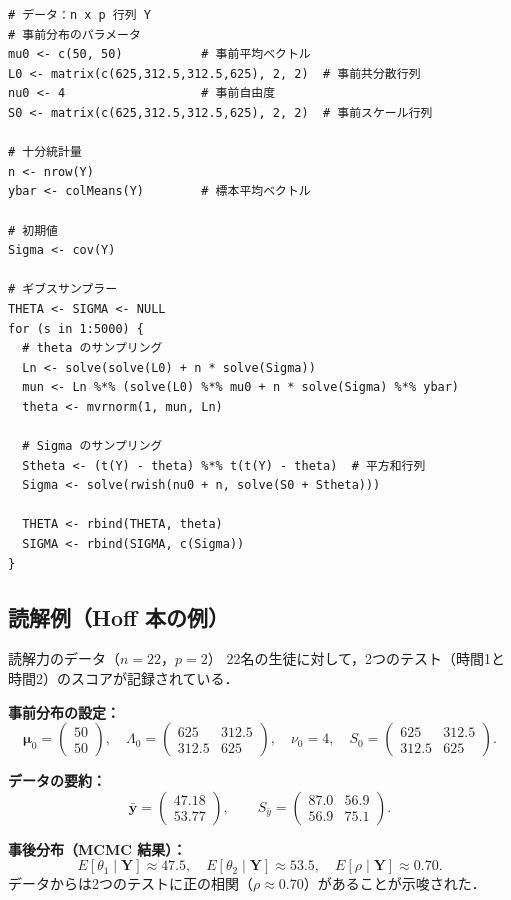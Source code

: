 \documentclass[lualatex,ja=standard,a4paper,12pt]{bxjsarticle}
\begin{document}
\begin{lstlisting}
# データ：n x p 行列 Y
# 事前分布のパラメータ
mu0 <- c(50, 50)           # 事前平均ベクトル
L0 <- matrix(c(625,312.5,312.5,625), 2, 2)  # 事前共分散行列
nu0 <- 4                   # 事前自由度
S0 <- matrix(c(625,312.5,312.5,625), 2, 2)  # 事前スケール行列

# 十分統計量
n <- nrow(Y)
ybar <- colMeans(Y)        # 標本平均ベクトル

# 初期値
Sigma <- cov(Y)

# ギブスサンプラー
THETA <- SIGMA <- NULL
for (s in 1:5000) {
  # theta のサンプリング
  Ln <- solve(solve(L0) + n * solve(Sigma))
  mun <- Ln %*% (solve(L0) %*% mu0 + n * solve(Sigma) %*% ybar)
  theta <- mvrnorm(1, mun, Ln)

  # Sigma のサンプリング
  Stheta <- (t(Y) - theta) %*% t(t(Y) - theta)  # 平方和行列
  Sigma <- solve(rwish(nu0 + n, solve(S0 + Stheta)))

  THETA <- rbind(THETA, theta)
  SIGMA <- rbind(SIGMA, c(Sigma))
}
\end{lstlisting}

\subsection{読解例（Hoff 本の例）}

\begin{exbox}{読解力のデータ（$n = 22$，$p = 2$）}
22名の生徒に対して，2つのテスト（時間1と時間2）のスコアが記録されている．

\medskip
\textbf{事前分布の設定：}
\[
  \bm{\mu}_0 = \begin{pmatrix} 50 \\ 50 \end{pmatrix}, \quad
  \Lambda_0 = \begin{pmatrix} 625 & 312.5 \\ 312.5 & 625 \end{pmatrix},
  \quad \nu_0 = 4,\quad
  S_0 = \begin{pmatrix} 625 & 312.5 \\ 312.5 & 625 \end{pmatrix}.
\]

\medskip
\textbf{データの要約：}
\[
  \bar{\bm{y}} = \begin{pmatrix} 47.18 \\ 53.77 \end{pmatrix},
  \qquad
  S_{\bar{y}} = \begin{pmatrix} 87.0 & 56.9 \\ 56.9 & 75.1 \end{pmatrix}.
\]

\medskip
\textbf{事後分布（MCMC 結果）：}
\[
  E[\theta_1 \mid \bm{Y}] \approx 47.5, \quad
  E[\theta_2 \mid \bm{Y}] \approx 53.5, \quad
  E[\rho \mid \bm{Y}] \approx 0.70.
\]
データからは2つのテストに正の相関（$\rho \approx 0.70$）があることが示唆された．
\end{exbox}
\end{document}
